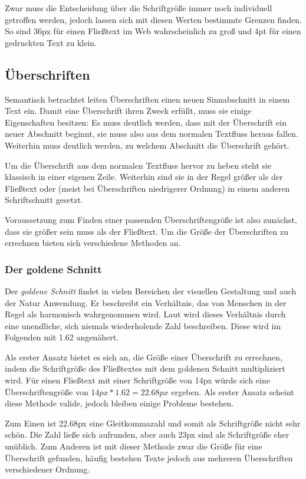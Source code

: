 Zwar muss die Entscheidung über die Schriftgröße immer noch individuell getroffen werden, jedoch lassen sich mit diesen Werten bestimmte Grenzen finden. So sind 36px für einen Fließtext im Web wahrscheinlich zu groß und 4pt für einen gedruckten Text zu klein.

\subsection{Überschriften}
Semantisch betrachtet leiten Überschriften einen neuen Sinnabschnitt in einem Text ein. Damit eine Überschrift ihren Zweck erfüllt, muss sie einige Eigenschaften besitzen:
Es muss deutlich werden, dass mit der Überschrift ein neuer Abschnitt beginnt, sie muss also aus dem normalen Textfluss heraus fallen. Weiterhin muss deutlich werden, zu welchem Abschnitt die Überschrift gehört.

Um die Überschrift aus dem normalen Textfluss hervor zu heben steht sie klassisch in einer eigenen Zeile. Weiterhin sind sie in der Regel größer als der Fließtext oder (meist bei Überschriften niedrigerer Ordnung) in einem anderen Schriftschnitt gesetzt.

Voraussetzung zum Finden einer passenden Überschriftengröße ist also zunächst, dass sie größer sein muss als der Fließtext. Um die Größe der Überschriften zu errechnen bieten sich verschiedene Methoden an.

\subsubsection{Der goldene Schnitt}
Der \textit{goldene Schnitt} findet in vielen Bereichen der visuellen Gestaltung und auch der Natur Anwendung. Er beschreibt ein Verhältnis, das von Menschen in der Regel als harmonisch wahrgenommen wird.
Laut \cite{livio2003golden} wird dieses Verhältnis durch eine unendliche, sich niemals wiederholende Zahl beschreiben. Diese wird im Folgenden mit 1.62 angenähert.

Als erster Ansatz bietet es sich an, die Größe einer Überschrift zu errechnen, indem die Schriftgröße des Fließtextes mit dem goldenen Schnitt multipliziert wird.
Für einen Fließtext mit einer Schriftgröße von 14px würde sich eine Überschriftengröße von \(14px * 1.62 = 22.68px\) ergeben.
Als erster Ansatz scheint diese Methode valide, jedoch bleiben einige Probleme bestehen.

Zum Einen ist 22.68px eine Gleitkommazahl und somit als Schriftgröße nicht sehr schön. Die Zahl ließe sich aufrunden, aber auch 23px sind als Schriftgröße eher unüblich.
Zum Anderen ist mit dieser Methode zwar die Größe für eine Überschrift gefunden, häufig bestehen Texte jedoch aus mehreren Überschriften verschiedener Ordnung.

